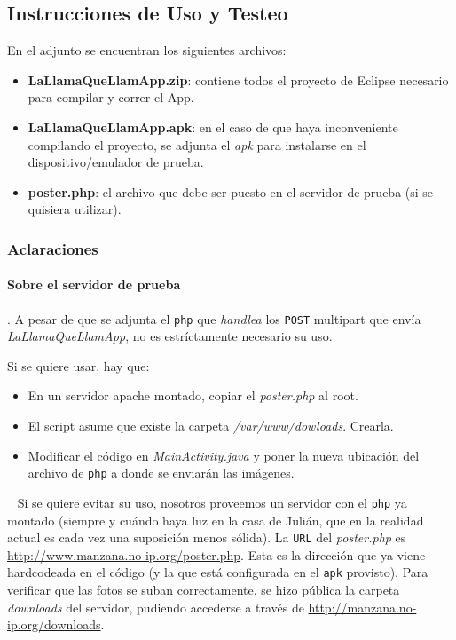 \subsection{Instrucciones de Uso y Testeo}
En el adjunto se encuentran los siguientes archivos:
\begin{itemize}
	\item \textbf{LaLlamaQueLlamApp.zip}: contiene todos el proyecto de Eclipse necesario para compilar y correr el App.
	\item \textbf{LaLlamaQueLlamApp.apk}: en el caso de que haya inconveniente compilando el proyecto, se adjunta el \emph{apk} para instalarse en el dispositivo/emulador de prueba.
	\item \textbf{poster.php}: el archivo que debe ser puesto en el servidor de prueba (si se quisiera utilizar).
\end{itemize}

\subsubsection{Aclaraciones}
\paragraph{Sobre el servidor de prueba}. A pesar de que se adjunta el \texttt{php} que \emph{handlea} los \texttt{POST} multipart que envía \emph{LaLlamaQueLlamApp}, no es estríctamente necesario su uso.

Si se quiere usar, hay que:
\begin{itemize}
	\item En un servidor apache montado, copiar el \emph{poster.php} al root.
	\item El script asume que existe la carpeta \emph{/var/www/dowloads}. Crearla.
	\item Modificar el código en \emph{MainActivity.java} y poner la nueva ubicación del archivo de \texttt{php} a donde se enviarán las imágenes.
\end{itemize}

~\newline
Si se quiere evitar su uso, nosotros proveemos un servidor con el \texttt{php} ya montado (siempre y cuándo haya luz en la casa de Julián, que en la realidad actual es cada vez una suposición menos sólida). La \texttt{URL} del \emph{poster.php} es \url{http://www.manzana.no-ip.org/poster.php}. Esta es la dirección que ya viene hardcodeada en el código (y la que está configurada en el \texttt{apk} provisto). Para verificar que las fotos se suban correctamente, se hizo pública la carpeta \emph{downloads} del servidor, pudiendo accederse a través de \url{http://manzana.no-ip.org/downloads}.

